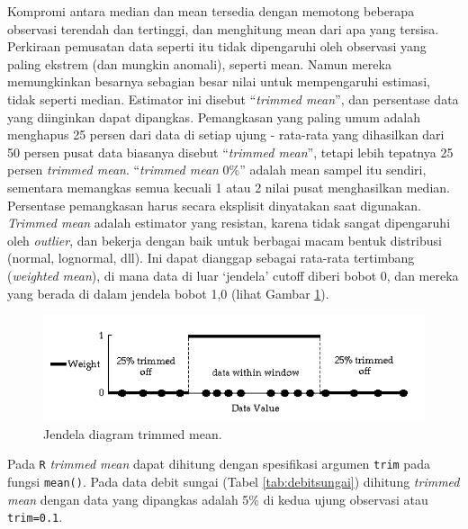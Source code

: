 \documentclass[]{book}
\newenvironment{Shaded}{\begin{snugshade}}{\end{snugshade}}
\newcommand{\KeywordTok}[1]{\textcolor[rgb]{0.13,0.29,0.53}{\textbf{#1}}}
\newcommand{\DataTypeTok}[1]{\textcolor[rgb]{0.13,0.29,0.53}{#1}}
\newcommand{\FloatTok}[1]{\textcolor[rgb]{0.00,0.00,0.81}{#1}}
\newcommand{\OperatorTok}[1]{\textcolor[rgb]{0.81,0.36,0.00}{\textbf{#1}}}
\newcommand{\NormalTok}[1]{#1}
\begin{document}
Kompromi antara median dan mean tersedia dengan memotong beberapa
observasi terendah dan tertinggi, dan menghitung mean dari apa yang
tersisa. Perkiraan pemusatan data seperti itu tidak dipengaruhi oleh
observasi yang paling ekstrem (dan mungkin anomali), seperti mean. Namun
mereka memungkinkan besarnya sebagian besar nilai untuk mempengaruhi
estimasi, tidak seperti median. Estimator ini disebut ``\emph{trimmed
mean}'', dan persentase data yang diinginkan dapat dipangkas.
Pemangkasan yang paling umum adalah menghapus 25 persen dari data di
setiap ujung - rata-rata yang dihasilkan dari 50 persen pusat data
biasanya disebut ``\emph{trimmed mean}'', tetapi lebih tepatnya 25
persen \emph{trimmed mean}. ``\emph{trimmed mean} 0\%'' adalah mean
sampel itu sendiri, sementara memangkas semua kecuali 1 atau 2 nilai
pusat menghasilkan median. Persentase pemangkasan harus secara eksplisit
dinyatakan saat digunakan. \emph{Trimmed mean} adalah estimator yang
resistan, karena tidak sangat dipengaruhi oleh \emph{outlier}, dan
bekerja dengan baik untuk berbagai macam bentuk distribusi (normal,
lognormal, dll). Ini dapat dianggap sebagai rata-rata tertimbang
(\emph{weighted mean}), di mana data di luar `jendela' cutoff diberi
bobot 0, dan mereka yang berada di dalam jendela bobot 1,0 (lihat Gambar
\ref{fig:tm}).

\begin{figure}

{\centering \includegraphics[width=0.7\linewidth]{tm} 

}

\caption{Jendela diagram trimmed mean.}\label{fig:tm}
\end{figure}

Pada \texttt{R} \emph{trimmed mean} dapat dihitung dengan spesifikasi
argumen \texttt{trim} pada fungsi \texttt{mean()}. Pada data debit
sungai (Tabel \ref{tab:debitsungai}) dihitung \emph{trimmed mean} dengan
data yang dipangkas adalah 5\% di kedua ujung observasi atau
\texttt{trim=0.1}.

\begin{Shaded}
\end{Shaded}
\end{document}
